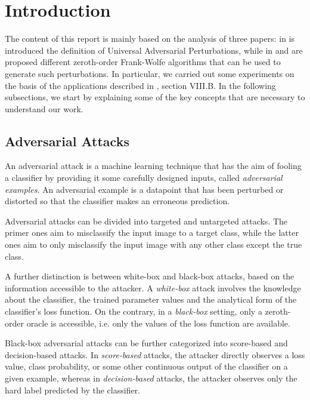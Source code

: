 \section{Introduction}
The content of this report is mainly based on the analysis of three papers:
in \cite{A2} is introduced the definition of Universal Adversarial Perturbations, while in \cite{A3} and
\cite{A4} are proposed different zeroth-order Frank-Wolfe algorithms that can be used to generate such perturbations. In particular, we carried out some experiments 
on the basis of the applications described in \cite{A3}, section VIII.B.
In the following subsections, we start by explaining some of the key concepts that are necessary to understand our work.

\subsection{Adversarial Attacks}
An adversarial attack is a machine learning technique that has the aim of fooling a classifier by providing it some
carefully designed inputs, called \textit{adversarial examples}. An adversarial example is a datapoint that has
been perturbed or distorted so that the classifier makes an erroneous prediction.

Adversarial attacks can be divided into targeted and untargeted attacks. The primer ones aim to
misclassify the input image to a target class, while the latter ones aim to only misclassify
the input image with any other class except the true class.

A further distinction is between white-box and black-box attacks, based on
the information accessible to the attacker. A \textit{white-box} attack involves the knowledge about the classifier, the trained
parameter values and the analytical form of the classifier's loss function. On
the contrary, in a \textit{black-box} setting, only a zeroth-order oracle is accessible, i.e. only the values of the loss function are available.

Black-box adversarial attacks can be further categorized into score-based and decision-based attacks.
In \textit{score-based} attacks, the attacker directly observes a loss value, class probability, or some other
continuous output of the classifier on a given example, whereas in \textit{decision-based} attacks, the attacker
observes only the hard label predicted by the classifier.


